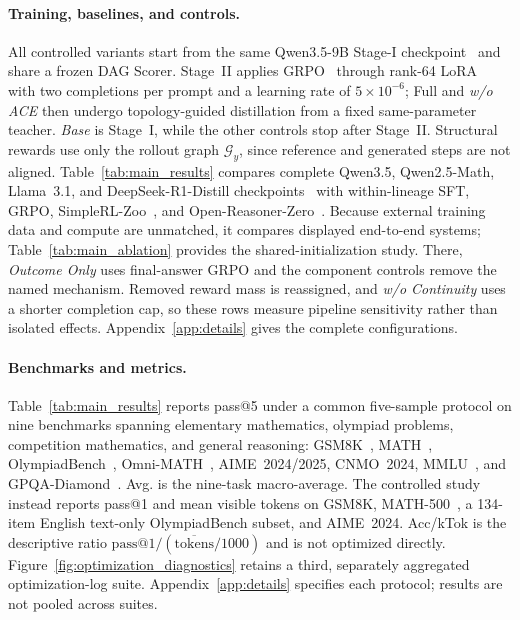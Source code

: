 \paragraph{Training, baselines, and controls.}
All controlled variants start from the same Qwen3.5-9B Stage-I checkpoint~\citep{qwen35team2026} and share a frozen DAG Scorer. Stage~II applies GRPO~\citep{shao2024deepseekmath} through rank-64 LoRA~\citep{hu2022lora} with two completions per prompt and a learning rate of $5\times10^{-6}$; Full and \emph{w/o ACE} then undergo topology-guided distillation from a fixed same-parameter teacher. \emph{Base} is Stage~I, while the other controls stop after Stage~II. Structural rewards use only the rollout graph $\mathcal{G}_y$, since reference and generated steps are not aligned. Table~\ref{tab:main_results} compares complete Qwen3.5, Qwen2.5-Math, Llama~3.1, and DeepSeek-R1-Distill checkpoints~\citep{qwen35team2026_2b,qwen35team2026_4b,yang2024qwen2,grattafiori2024llama,deepseekr1} with within-lineage SFT, GRPO, SimpleRL-Zoo~\citep{zeng2025simplerlzoo}, and Open-Reasoner-Zero~\citep{hu2026open}. Because external training data and compute are unmatched, it compares displayed end-to-end systems; Table~\ref{tab:main_ablation} provides the shared-initialization study. There, \emph{Outcome Only} uses final-answer GRPO and the component controls remove the named mechanism. Removed reward mass is reassigned, and \emph{w/o Continuity} uses a shorter completion cap, so these rows measure pipeline sensitivity rather than isolated effects. Appendix~\ref{app:details} gives the complete configurations.

\paragraph{Benchmarks and metrics.}
Table~\ref{tab:main_results} reports pass@5 under a common five-sample protocol on nine benchmarks spanning elementary mathematics, olympiad problems, competition mathematics, and general reasoning: GSM8K~\citep{cobbe2021gsm8k}, MATH~\citep{hendrycks2021math}, OlympiadBench~\citep{he2024olympiadbench}, Omni-MATH~\citep{gao2024omnimath}, AIME~2024/2025, CNMO~2024, MMLU~\citep{hendrycks2020mmlu}, and GPQA-Diamond~\citep{rein2023gpqa}. Avg. is the nine-task macro-average. The controlled study instead reports pass@1 and mean visible tokens on GSM8K, MATH-500~\citep{lightman2023lets}, a 134-item English text-only OlympiadBench subset, and AIME~2024. Acc/kTok is the descriptive ratio $\mathrm{pass@1}/(\overline{\mathrm{tokens}}/1000)$ and is not optimized directly. Figure~\ref{fig:optimization_diagnostics} retains a third, separately aggregated optimization-log suite. Appendix~\ref{app:details} specifies each protocol; results are not pooled across suites.

